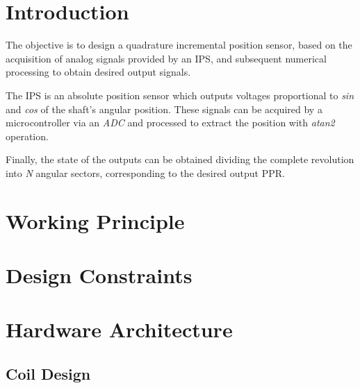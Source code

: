\documentclass[12pt,a4paper,twoside]{article}
\begin{document}
    \section{Introduction}
    The objective is to design a quadrature incremental position sensor, based on the 
    acquisition of analog signals provided by an \ac{IPS},
    and subsequent numerical processing to obtain desired output signals.

    The \ac{IPS} is an absolute position sensor which outputs voltages proportional 
    to {\it sin} and {\it cos} of the shaft's angular position.
    These signals can be acquired by a microcontroller via an {\it ADC} and 
    processed to extract the position with {\it atan2} operation.

    Finally, the state of the outputs can be obtained dividing the complete 
    revolution into {\it N} angular sectors, corresponding to the desired 
    output \ac{PPR}.

    \FloatBarrier
    \section{Working Principle}
    \FloatBarrier

    \newpage
    \section{Design Constraints}
    

    \newpage
    
    \section{Hardware Architecture}
    \FloatBarrier

    \subsection{Coil Design}

\end{document}
